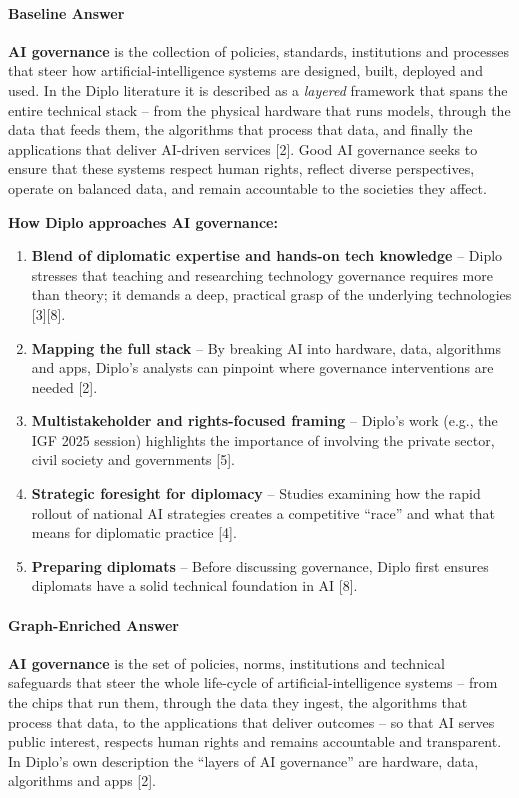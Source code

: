 \documentclass[11pt,a4paper]{article}
\begin{document}
\paragraph{Baseline Answer}
\textbf{AI governance} is the collection of policies, standards, institutions and processes that steer how artificial-intelligence systems are designed, built, deployed and used. In the Diplo literature it is described as a \textit{layered} framework that spans the entire technical stack -- from the physical hardware that runs models, through the data that feeds them, the algorithms that process that data, and finally the applications that deliver AI-driven services [2]. Good AI governance seeks to ensure that these systems respect human rights, reflect diverse perspectives, operate on balanced data, and remain accountable to the societies they affect.

\textbf{How Diplo approaches AI governance:}
\begin{enumerate}[nosep]
\item \textbf{Blend of diplomatic expertise and hands-on tech knowledge} -- Diplo stresses that teaching and researching technology governance requires more than theory; it demands a deep, practical grasp of the underlying technologies [3][8].
\item \textbf{Mapping the full stack} -- By breaking AI into hardware, data, algorithms and apps, Diplo's analysts can pinpoint where governance interventions are needed [2].
\item \textbf{Multistakeholder and rights-focused framing} -- Diplo's work (e.g., the IGF 2025 session) highlights the importance of involving the private sector, civil society and governments [5].
\item \textbf{Strategic foresight for diplomacy} -- Studies examining how the rapid rollout of national AI strategies creates a competitive ``race'' and what that means for diplomatic practice [4].
\item \textbf{Preparing diplomats} -- Before discussing governance, Diplo first ensures diplomats have a solid technical foundation in AI [8].
\end{enumerate}

\paragraph{Graph-Enriched Answer}
\textbf{AI governance} is the set of policies, norms, institutions and technical safeguards that steer the whole life-cycle of artificial-intelligence systems -- from the chips that run them, through the data they ingest, the algorithms that process that data, to the applications that deliver outcomes -- so that AI serves public interest, respects human rights and remains accountable and transparent. In Diplo's own description the ``layers of AI governance'' are hardware, data, algorithms and apps [2].
\end{document}
